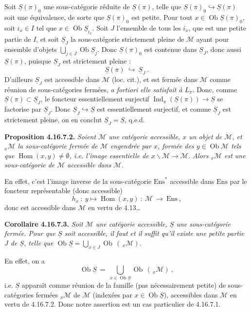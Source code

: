\documentclass[11pt]{article}
\newcommand{\msp}[1]{\marginpar{\footnotesize [#1]}}
\newcommand{\Ob}{\operatorname{Ob}}
\newcommand{\Hom}{\operatorname{Hom}}
\newcommand{\Ind}{\operatorname{Ind}}
\newcommand{\cM}{\mathcal{M}}
\newcommand{\uS}{\underline{S}}
\begin{document}
\msp{page 478}
Soit $\uS(\pi)_0$ une sous-catégorie réduite de $\uS(\pi)$, telle que $\uS(\pi)_0 \hookrightarrow \uS(\pi)$ soit une équivalence, de sorte que $\uS(\pi)_0$ est petite. Pour tout $x \in \Ob \uS(\pi)_0$, soit $i_x \in I$ tel que $x \in \Ob \uS_{i_x}$. Soit $J$ l'ensemble de tous les $i_x$, que est une petite partie de $I$, et soit $\uS_J$ la sous-catégorie strictement pleine de $\cM$ ayant pour ensemble d'objets $\bigcup_{j\in J} \Ob \uS_j$. Donc $\uS(\pi)_0$ est contenue dans $\uS_J$, donc aussi $\uS(\pi)$, puisque $\uS_J$ est strictement pleine : %
\[
\uS(\pi) \ \hookrightarrow\ \uS_J \ .
\]
D'ailleurs $\uS_J$ est accessible dans $\cM$ (loc. cit.), et est fermée dans $\cM$ comme réunion de sous-catégories fermées, \textit{a fortiori elle satisfait à $L_\pi$}. Donc, comme $\uS(\pi) \subset \uS_J$, le foncteur essentiellement surjectif $\Ind_\pi(\uS(\pi)) \longrightarrow \uS$ se factorise par $\uS_J$. Donc $\uS_J \hookrightarrow \uS$ est essentiellement surjectif, et comme $\uS_J$ est strictement pleine, on en conclut $\uS_J = \uS$, q.e.d.

\msp{page 479}
\textbf{Proposition 4.16.7.2.} \textit{Soient $\cM$ une catégorie accessible, $x$ un objet de $\cM$, et ${}_x\cM$ la sous-catégorie fermée de $\cM$ engendrée par $x$, formée des $y \in \Ob \cM$ tels que $\Hom(x,y) \neq \emptyset$, i.e. l'image essentielle de $x\backslash\cM \longrightarrow \cM$. Alors ${}_x\cM$ est une sous-catégorie de $\cM$ accessible dans $\cM$.}

En effet, c'est l'image inverse de la sous-catégorie $\mathrm{Ens}^*$ accessible dans $\mathrm{Ens}$ par le foncteur représentable (donc accessible)
\[
h_x \ :\ y \longmapsto \Hom(x,y) \ :\ \cM \ \longrightarrow\ \mathrm{Ens} \ ,
\]
donc est accessible dans $\cM$ en vertu de 4.13\dots

\textbf{Corollaire 4.16.7.3.} \textit{Soit $\cM$ une catégorie accessible, $\uS$ une sous-catégorie fermée. Pour que $\uS$ soit accessible, il faut et il suffit qu'il existe une \textup{petite} partie $J$ de $\uS$, telle que $\Ob \uS = \bigcup_{x\in J} \Ob\,(\,{}_x\cM)$.}

En effet, on a
\[
\Ob \uS \ =\ \bigcup_{x\in\Ob\uS} \Ob\,(\,{}_x\cM) \ ,
\]
i.e. $\uS$ apparaît comme réunion de
\msp{page 480}
la famille (pas nécessairement petite) de sous-catégories fermées ${}_x\cM$ de $\cM$ (indexées par $x \in \Ob \uS$), accessibles dans $\cM$ en vertu de 4.16.7.2. Donc notre assertion est un cas particulier de 4.16.7.1.
\end{document}
